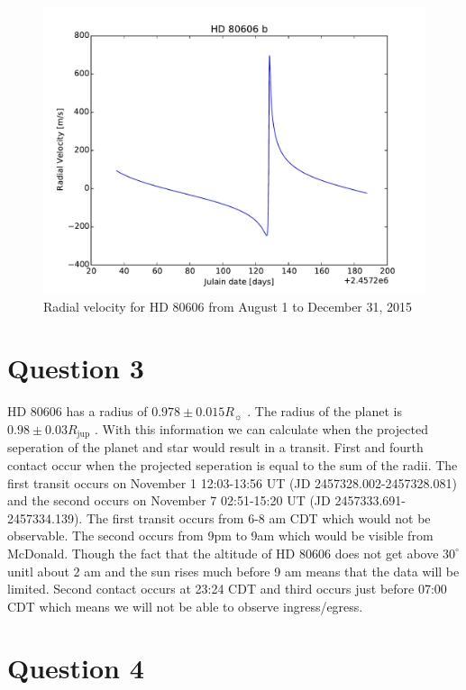 \documentclass[preprint]{aastex}
\begin{document}
\begin{figure}[h]
\begin{center}
    \includegraphics[width=\textwidth]{Q2.pdf}
    \caption{Radial velocity for HD 80606 from August 1 to December 31, 2015}
    \label{fig:RV}
\end{center}
\end{figure}

\section{Question 3}

HD 80606 has a radius of $0.978\pm0.015 R_\sun$ \citep{orbparam}. The radius of the planet is $0.98\pm0.03 R_\mathrm{jup}$ \citep{orbparam}. With this information we can calculate when the projected seperation of the planet and star would result in a transit. First and fourth contact occur when the projected seperation is equal to the sum of the radii. The first transit occurs on November 1 12:03-13:56 UT (JD 2457328.002-2457328.081) and the second occurs on November 7 02:51-15:20 UT (JD 2457333.691-2457334.139). The first transit occurs from 6-8 am CDT which would not be observable. The second occurs from 9pm to 9am which would be visible from McDonald. Though the fact that the altitude of HD 80606 does not get above $30^\circ$ unitl about 2 am and the sun rises much before 9 am means that the data will be limited. Second contact occurs at 23:24 CDT and third occurs just before 07:00 CDT which means we will not be able to observe ingress/egress.

\section{Question 4}
\end{document}
